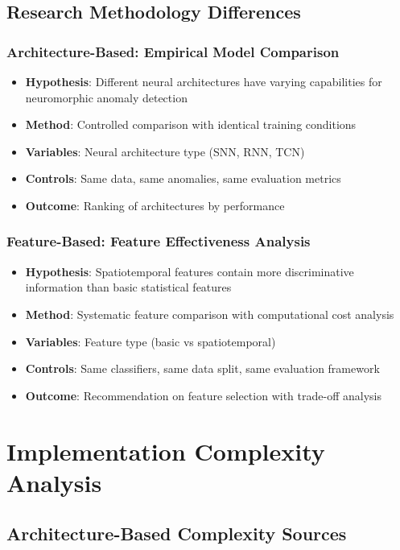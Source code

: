 \documentclass[11pt,a4paper]{article}
\begin{document}
\subsection{Research Methodology Differences}

\subsubsection{Architecture-Based: Empirical Model Comparison}
\begin{itemize}
    \item \textbf{Hypothesis}: Different neural architectures have varying capabilities for neuromorphic anomaly detection
    \item \textbf{Method}: Controlled comparison with identical training conditions
    \item \textbf{Variables}: Neural architecture type (SNN, RNN, TCN)
    \item \textbf{Controls}: Same data, same anomalies, same evaluation metrics
    \item \textbf{Outcome}: Ranking of architectures by performance
\end{itemize}

\subsubsection{Feature-Based: Feature Effectiveness Analysis}
\begin{itemize}
    \item \textbf{Hypothesis}: Spatiotemporal features contain more discriminative information than basic statistical features
    \item \textbf{Method}: Systematic feature comparison with computational cost analysis
    \item \textbf{Variables}: Feature type (basic vs spatiotemporal)
    \item \textbf{Controls}: Same classifiers, same data split, same evaluation framework
    \item \textbf{Outcome}: Recommendation on feature selection with trade-off analysis
\end{itemize}

\section{Implementation Complexity Analysis}

\subsection{Architecture-Based Complexity Sources}
\end{document}
